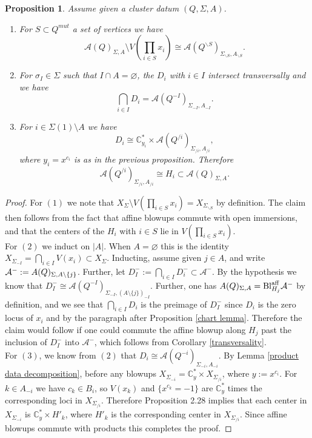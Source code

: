 \documentclass[11pt]{amsart}
\newtheorem{prop}[thm]{Proposition}
\theoremstyle{definition}
\theoremstyle{remark}
\newcommand{\A}{\mathcal{A}}
\renewcommand{\emptyset}{\varnothing}
\numberwithin{equation}{section}
\begin{document}
\begin{prop}\label{quiver geometry}
    Assume given a cluster datum $(Q, \Sigma, A)$.
    
    \begin{enumerate}
        \item For $S \subset Q^{mut}$ a set of vertices we have $$\mathcal{A}(Q)_{\Sigma, A}\setminus V(\prod_{i \in S}x_i) \cong \mathcal{A}(Q^{\backslash S})_{\Sigma_{\backslash S}, A_{\backslash S}}.$$
        \item For $\sigma_I \in \Sigma$ such that $I \cap A = \emptyset$, the $D_i$ with $i \in I$ intersect transversally and we have $$\bigcap_{i \in I} D_i = \mathcal{A}(Q^{-I})_{\Sigma_{-I}, A_{-I}}.$$
        \item For $i \in \Sigma(1) \setminus A$ we have $$D_i \cong \mathbb{C}^*_{y_i} \times \mathcal{A}(Q^{/i})_{\Sigma_{/i}, A_{/i}},$$ where $y_i = x^{c_i}$ is as in the previous proposition. Therefore $$\mathcal{A}(Q^{/i})_{\Sigma_{/i}, A_{/i}} \cong H_i \subset \mathcal{A}(Q)_{\Sigma, A}.$$
    \end{enumerate}
\end{prop}

\begin{proof}
    For $(1)$ we note that $X_\Sigma \setminus V(\prod_{i\in S} x_i) = X_{\Sigma_{\backslash S}}$ by definition. The claim then follows from the fact that affine blowups commute with open immersions, and that the centers of the $H_i$ with $i \in S$ lie in $V(\prod_{i \in S} x_i)$.\\

    For $(2)$ we induct on $|A|$. When $A = \emptyset$ this is the identity $X_{\Sigma_{-I}} = \bigcap_{i\in I}V(x_i)\subset X_\Sigma$. Inducting, assume given $j \in A$, and write $\A^-:=\mathcal \A(Q)_{\Sigma,A\setminus \{j\}}$. Further, let $D^-_I:=\bigcap_{i \in I} D^-_i\subset \A^-$. By the hypothesis we know that $D_I^-\cong\mathcal A(Q^{-I})_{\Sigma_{-I},(A\setminus \{j\})_{-I}}$. Further, one has $\mathcal \A(Q)_{\Sigma,A}=\mathrm{Bl}^{\mathrm{aff}}_{H_j}\A^-$ by definition, and we see that $\bigcap_{i \in I} D_i$ is the preimage of $D_I^-$ since $D_i$ is the zero locus of $x_i$ and by the paragraph after Proposition \ref{chart lemma}. Therefore the claim would follow if one could commute the affine blowup along $H_j$ past the inclusion of $D_I^-$ into $\A^-$, which follows from Corollary \ref{transversality}.\\

    For $(3)$, we know from $(2)$ that $D_i\cong\mathcal A(Q^{-i})_{\Sigma_{-i},A_{-i}}$. By Lemma \ref{product data decomposition}, before any blowups $X_{\Sigma_{-i}}=\mathbb C^*_y\times X_{\Sigma_{/i}}$, where $y:=x^{c_i}$. For $k\in A_{-i}$ we have $c_k\in B_i$, so $V(x_k)$ and $\{x^{c_k}=-1\}$ are $\mathbb C^*_y$ times the corresponding loci in $X_{\Sigma_{/i}}$. Therefore Proposition 2.28 implies that each center in $X_{\Sigma_{-i}}$ is $\mathbb C^*_y\times H'_k$, where $H'_k$ is the corresponding center in $X_{\Sigma_{/i}}$. Since affine blowups commute with products this completes the proof.
\end{proof}
\end{document}

